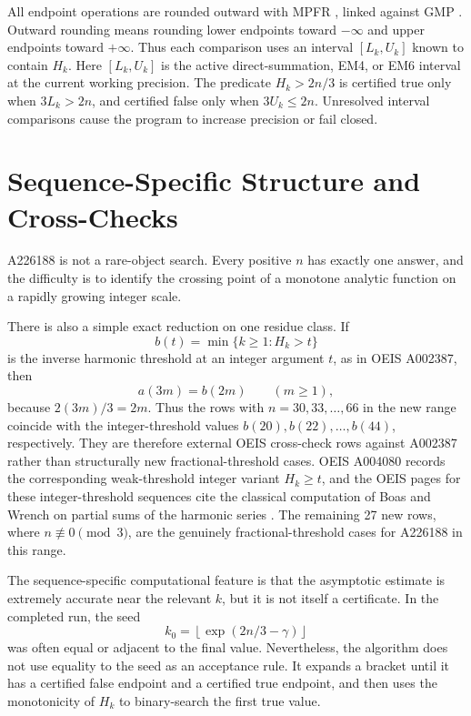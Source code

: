 \documentclass[11pt]{article}
\theoremstyle{definition}
\theoremstyle{remark}
\begin{document}
All endpoint operations are rounded outward with MPFR \cite{mpfr}, linked
against GMP \cite{gmp}.  Outward rounding means rounding lower endpoints toward
\(-\infty\) and upper endpoints toward \(+\infty\).  Thus each comparison
uses an interval \([L_k,U_k]\) known to contain \(H_k\).  Here
\([L_k,U_k]\) is the active direct-summation, EM4, or EM6 interval at the
current working precision.  The predicate
\(H_k>2n/3\) is certified true only when \(3L_k>2n\), and certified false only
when \(3U_k\leq 2n\).  Unresolved interval comparisons cause the program to
increase precision or fail closed.

\section{Sequence-Specific Structure and Cross-Checks}

A226188 is not a rare-object search.  Every positive \(n\) has exactly one
answer, and the difficulty is to identify the crossing point of a monotone
analytic function on a rapidly growing integer scale.

There is also a simple exact reduction on one residue class.  If
\[
  b(t)=\min\{k\geq 1:H_k>t\}
\]
is the inverse harmonic threshold at an integer argument \(t\), as in OEIS
A002387, then
\[
  a(3m)=b(2m) \qquad (m\geq 1),
\]
because \(2(3m)/3=2m\).  Thus the rows with
\(n=30,33,\ldots,66\) in the new range coincide with the integer-threshold
values \(b(20),b(22),\ldots,b(44)\), respectively.  They are therefore
external OEIS cross-check rows against A002387 rather than structurally new
fractional-threshold cases.  OEIS A004080 records the corresponding
weak-threshold integer variant \(H_k\geq t\), and the OEIS pages for these
integer-threshold sequences cite the classical computation of Boas and Wrench
on partial sums of the harmonic series \cite{oeisIntegerThresholds,boasWrench}.
The remaining 27 new rows, where \(n\not\equiv0\pmod 3\), are the genuinely
fractional-threshold cases for A226188 in this range.

The sequence-specific computational feature is that the asymptotic estimate is
extremely accurate near the relevant \(k\), but it is not itself a certificate.
In the completed run, the seed
\[
  k_0=\left\lfloor\exp(2n/3-\gamma)\right\rfloor
\]
was often equal or adjacent to the final value.  Nevertheless, the algorithm
does not use equality to the seed as an acceptance rule.  It expands a bracket
until it has a certified false endpoint and a certified true endpoint, and then
uses the monotonicity of \(H_k\) to binary-search the first true value.
\end{document}
